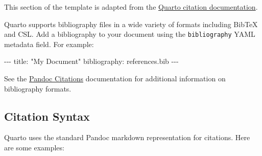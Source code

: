 \documentclass[
]{article}
\newenvironment{Shaded}{\begin{snugshade}}{\end{snugshade}}
\newcommand{\AttributeTok}[1]{\textcolor[rgb]{0.40,0.45,0.13}{#1}}
\newcommand{\FunctionTok}[1]{\textcolor[rgb]{0.28,0.35,0.67}{#1}}
\newcommand{\KeywordTok}[1]{\textcolor[rgb]{0.00,0.23,0.31}{#1}}
\newcommand{\PreprocessorTok}[1]{\textcolor[rgb]{0.68,0.00,0.00}{#1}}
\newcommand{\StringTok}[1]{\textcolor[rgb]{0.13,0.47,0.30}{#1}}
\begin{document}
This section of the template is adapted from the
\href{https://quarto.org/docs/authoring/footnotes-and-citations.html}{Quarto
citation documentation}.

Quarto supports bibliography files in a wide variety of formats
including BibTeX and CSL. Add a bibliography to your document using the
\texttt{bibliography} YAML metadata field. For example:

\begin{Shaded}
\begin{Highlighting}[]
\PreprocessorTok{{-}{-}{-}}
\FunctionTok{title}\KeywordTok{:}\AttributeTok{ }\StringTok{"My Document"}
\FunctionTok{bibliography}\KeywordTok{:}\AttributeTok{ references.bib}
\PreprocessorTok{{-}{-}{-}}
\end{Highlighting}
\end{Shaded}

See the \href{https://pandoc.org/MANUAL.html\#citations}{Pandoc
Citations} documentation for additional information on bibliography
formats.

\hypertarget{sec-citations}{%
\subsection{Citation Syntax}\label{sec-citations}}

Quarto uses the standard Pandoc markdown representation for citations.
Here are some examples:
\end{document}
